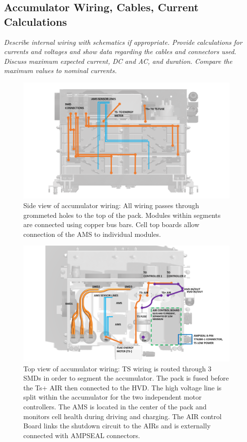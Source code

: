\documentclass{article}
\begin{document}
\newpage

\subsection{Accumulator Wiring, Cables, Current Calculations}

    \textit{Describe internal wiring with schematics if appropriate. Provide calculations for currents and voltages and show data regarding the cables and connectors used. Discuss maximum expected current, DC and AC, and duration. Compare the maximum values to nominal currents.}

        \begin{figure}[H]
            \centering
            \includegraphics[width = 0.9 \textwidth]{ACCUMULATOR_WIRING_SIDE}
            \caption{Side view of accumulator wiring: All wiring passes through grommeted holes to the top of the pack. Modules within segments are connected using copper bus bars. Cell top boards allow connection of the AMS to individual modules.}
            \label{ACCUMULATOR_WIRING_SIDE}
        \end{figure}

        \begin{figure}[H]
            \centering
            \includegraphics[width = 0.9 \textwidth]{ACCUMULATOR_WIRING_TOP}
            \caption{Top view of accumulator wiring: TS wiring is routed through 3 SMDs in order to segment the accumulator. The pack is fused before the Ts+ AIR then connected to the HVD. The high voltage line is split within the accumulator for the two independent motor controllers. The AMS is located in the center of the pack and monitors cell health during driving and charging. The AIR control Board links the shutdown circuit to the AIRs and is externally connected with AMPSEAL connectors.}
            \label{ACCUMULATOR_WIRING_SIDE}
        \end{figure}
\end{document}
